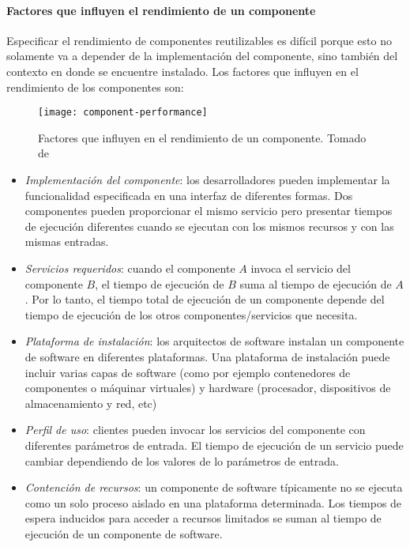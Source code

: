 \paragraph{Factores que influyen el rendimiento de un componente}
Especificar el rendimiento de componentes reutilizables es difícil porque esto no solamente va a depender de la implementación del componente, sino también del contexto en donde se encuentre instalado. Los factores que influyen en el rendimiento de los componentes son:

\begin{figure}[h]
  \centering
  \texttt{[image: component-performance]}
  \caption[Factores que influyen en el rendimiento de un componente]{Factores que influyen en el rendimiento de un componente. Tomado de \protect\cite{Koziolek:2010:PEC:1808359.1808729}}
  \label{fig:component-performance}
\end{figure}

\begin{itemize}
    \item \emph{Implementación del componente}: los desarrolladores pueden implementar la funcionalidad especificada en una interfaz de diferentes formas. Dos componentes pueden proporcionar el mismo servicio pero presentar tiempos de ejecución diferentes cuando se ejecutan con los mismos recursos y con las mismas entradas.
    \item \emph{Servicios requeridos}: cuando el componente $A$ invoca el servicio del componente $B$, el tiempo de ejecución de $B$ suma al tiempo de ejecución de $A$. Por lo tanto, el tiempo total de ejecución de un componente depende del tiempo de ejecución de los otros componentes/servicios que necesita.
    \item \emph{Plataforma de instalación}: los arquitectos de software instalan un componente de software en diferentes plataformas. Una plataforma de instalación puede incluir varias capas de software (como por ejemplo contenedores de componentes o máquinar virtuales) y hardware (procesador, dispositivos de almacenamiento y red, etc)
    \item \emph{Perfil de uso}: clientes pueden invocar los servicios del componente con diferentes parámetros de entrada. El tiempo de ejecución de un servicio puede cambiar dependiendo de los valores de lo parámetros de entrada.
    \item \emph{Contención de recursos}: un componente de software típicamente no se ejecuta como un solo proceso aislado en una plataforma determinada. Los tiempos de espera inducidos para acceder a recursos limitados se suman al tiempo de ejecución de un componente de software.
\end{itemize}

